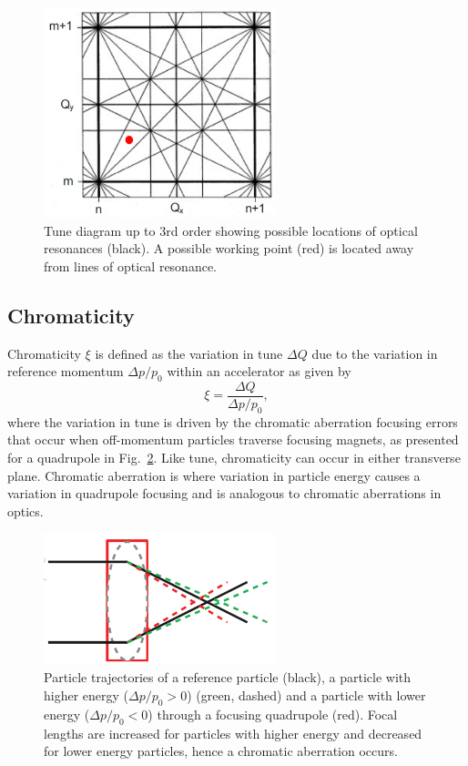 \documentclass[../main.tex]{subfiles}
\begin{document}
\begin{figure}[!h]
\centering
\includegraphics[width=0.6\textwidth]{Figures/Energy_Recovery_Linac_Design/Tune_Diagram_fixed.pdf}
\caption{Tune diagram up to 3rd order showing possible locations of optical resonances \cite{wille2000physics} (black). A possible working point (red) is located away from lines of optical resonance.}
\label{fig:tune_diagram}
\end{figure}

\subsection{Chromaticity}

Chromaticity $\xi$ is defined as the variation in tune $\Delta Q$ due to the variation in reference momentum $\Delta p/p_{0}$ within an accelerator as given by
\begin{equation}
\xi = \frac{\Delta Q}{\Delta p/p_{0}},
\label{eq:accelerator_chromaticity}    
\end{equation}
where the variation in tune is driven by the chromatic aberration focusing errors that occur when off-momentum particles traverse focusing magnets, as presented for a quadrupole in Fig.~\ref{fig:chromatic_aberration}. Like tune, chromaticity can occur in either transverse plane. Chromatic aberration is where variation in particle energy causes a variation in quadrupole focusing and is analogous to chromatic aberrations in optics. 
\begin{figure}[!h]
\centering
\includegraphics[width=0.6\textwidth]{Figures/Energy_Recovery_Linac_Design/Chromatic_Aberration_fixed.pdf}
\caption{Particle trajectories of a reference particle (black), a particle with higher energy ($\Delta p/p_{0}>0$) (green, dashed) and a particle with lower energy ($\Delta p/p_{0}<0$) through a focusing quadrupole (red). Focal lengths are increased for particles with higher energy and decreased for lower energy particles, hence a chromatic aberration occurs. }
\label{fig:chromatic_aberration}
\end{figure}
\end{document}
